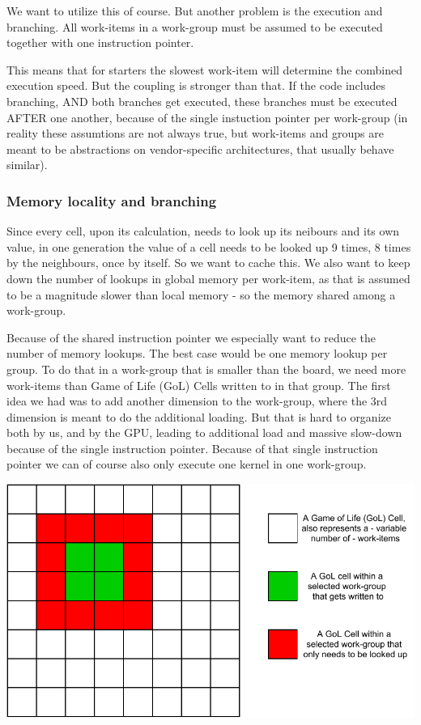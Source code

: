 \documentclass[a4paper,english,12pt,twoside=false]{scrartcl} %
\begin{document}
We want to utilize this of course. But another problem is the execution and branching. 
All work-items in a work-group must be assumed to be executed together with one instruction pointer.

This means that for starters the slowest work-item will determine the combined execution speed. 
But the coupling is stronger than that. If the code includes branching, AND both branches get executed,
these branches must be executed AFTER one another, because of the single instuction pointer per work-group 
(in reality these assumtions are not always true, but work-items and groups are meant to be abstractions on 
vendor-specific architectures, that usually behave similar).

\subsubsection{Memory locality and branching}

Since every cell, upon its calculation, needs to look up its neibours and its own value, in one generation the value of 
a cell needs to be looked up 9 times, 8 times by the neighbours, once by itself. So we want to cache this.
We also want to keep down the number of lookups in global memory per work-item, as that is assumed to be a magnitude slower 
than local memory - so the memory shared among a work-group.

Because of the shared instruction pointer we especially want to reduce the number of memory lookups. 
The best case would be one memory lookup per group.
To do that in a work-group that is smaller than the board, we need more work-items than Game of Life (GoL) Cells written to in that group.
The first idea we had was to add another dimension to the work-group, where the 3rd dimension is meant to do the additional loading. 
But that is hard to organize both by us, and by the GPU, leading to additional load and massive slow-down because of the single instruction pointer.
Because of that single instruction pointer we can of course also only execute one kernel in one work-group.

\begin{center}
    \label{fig:cl-mem-access}
    \includegraphics[width=\linewidth]{imgs/opencl_mem_access.drawio.pdf}
\end{center}
\end{document}

